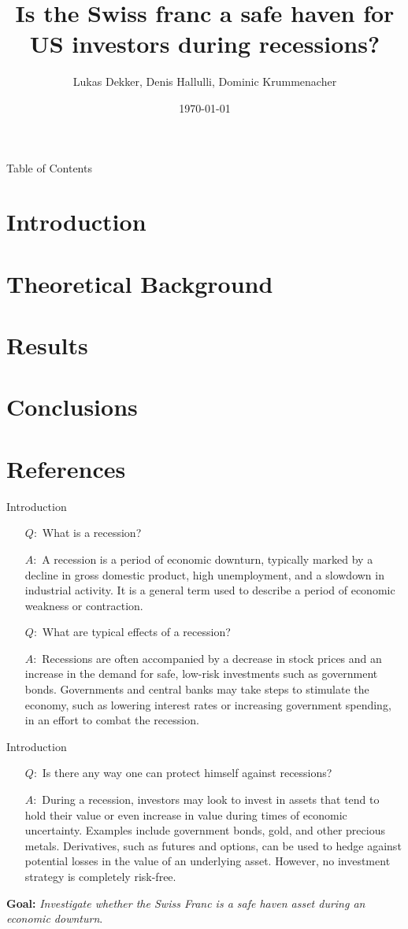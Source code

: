 \documentclass[11pt]{beamer}
\author{Lukas Dekker, Denis Hallulli, Dominic Krummenacher}
\title{Is the Swiss franc a safe haven for US investors during recessions?}
\institute[]{Digital Tools for Finance\\ Igor Pozdeev}
\date{\today}
\begin{document}
\begin{frame}
\titlepage
\end{frame}

\begin{frame}{Table of Contents}
\tableofcontents 
\end{frame}

\section{Introduction}
\section{Theoretical Background}
\section{Results}
\section{Conclusions}
\section{References}

\begin{frame}{Introduction}
\begin{itemize}
    \item[$Q:$] What is a recession?
    \item[$A:$] A recession is a period of economic downturn, typically marked by a decline in gross domestic product, high unemployment, and a slowdown in industrial activity. It is a general term used to describe a period of economic weakness or contraction.
    \item[$Q:$] What are typical effects of a recession?
    \item[$A:$] Recessions are often accompanied by a decrease in stock prices and an increase in the demand for safe, low-risk investments such as government bonds. Governments and central banks may take steps to stimulate the economy, such as lowering interest rates or increasing government spending, in an effort to combat the recession.
\end{itemize}
\end{frame}

\begin{frame}{Introduction}
\begin{itemize}
    \item[$Q:$] Is there any way one can protect himself against recessions?
    \item[$A:$] During a recession, investors may look to invest in assets that tend to hold their value or even increase in value during times of economic uncertainty. Examples include government bonds, gold, and other precious metals.  Derivatives, such as futures and options, can be used to hedge against potential losses in the value of an underlying asset. However, no investment strategy is completely risk-free.
\end{itemize}
\textbf{Goal:} \textit{Investigate whether the Swiss Franc is a safe haven asset during an economic downturn}.
\end{frame}
\end{document}
